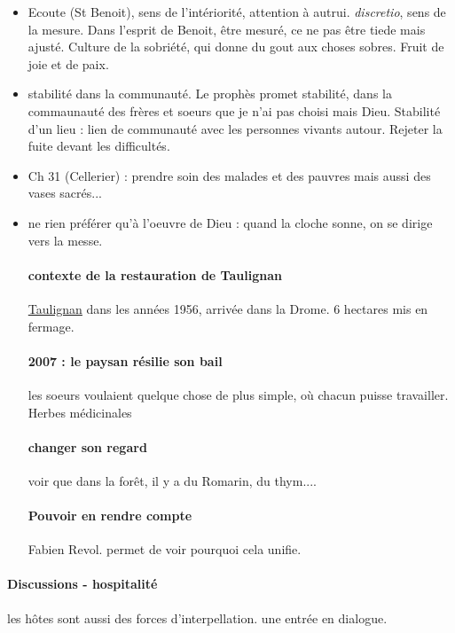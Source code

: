 \begin{itemize}
    \item Ecoute (St Benoit), sens de l'intériorité, attention à autrui. \textit{discretio}, sens de la mesure. Dans l'esprit de Benoit, être mesuré, ce ne pas être tiede mais ajusté. Culture de la sobriété, qui donne du gout aux choses sobres. Fruit de joie et de paix.
    \item stabilité dans la communauté. Le prophès promet stabilité, dans la commaunauté des frères et soeurs que je n'ai pas choisi mais Dieu.
    Stabilité d'un lieu : lien de communauté avec les personnes vivants autour. Rejeter la fuite devant les difficultés.
    \item Ch 31 (Cellerier) : prendre soin des malades et des pauvres mais aussi des vases sacrés... 
    \item ne rien préférer qu'à l'oeuvre de Dieu : quand la cloche sonne, on se dirige vers la messe.


\paragraph{contexte de la restauration de Taulignan} \href{https://www.dominicaines-taulignan.fr/demarche-ecologique}{Taulignan} dans les années 1956, arrivée dans la Drome.  6 hectares mis en fermage. 

\paragraph{2007 : le paysan résilie son bail} les soeurs voulaient quelque chose de plus simple, où chacun puisse travailler.  Herbes médicinales
\paragraph{changer son regard} voir que dans la forêt, il y a du Romarin, du thym....
\paragraph{Pouvoir en rendre compte} Fabien Revol. permet de voir pourquoi cela unifie. 
\end{itemize}

\paragraph{Discussions - hospitalité} les hôtes sont aussi des forces d'interpellation. une entrée en dialogue.

